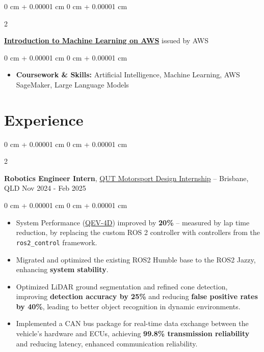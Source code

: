 \documentclass[10pt, letterpaper]{article}
\newenvironment{highlights}{
    \begin{itemize}[
        topsep=0.10 cm,
        parsep=0.10 cm,
        partopsep=0pt,
        itemsep=0pt,
        leftmargin=0 cm + 10pt
    ]
}{
    \end{itemize}
} %
\newenvironment{onecolentry}{
    \begin{adjustwidth}{
        0 cm + 0.00001 cm
    }{
        0 cm + 0.00001 cm
    }
}{
    \end{adjustwidth}
} %
\newenvironment{twocolentry}[2][]{
    \onecolentry
    \def\secondColumn{#2}
    \setcolumnwidth{\fill, 4.5 cm}
    \begin{paracol}{2}
}{
    \switchcolumn \raggedleft \secondColumn
    \end{paracol}
    \endonecolentry
} %
\begin{document}
\vspace{0.2 cm}

\begin{twocolentry}{
            issued by AWS
      }
      \textbf{\href{https://www.coursera.org/account/accomplishments/verify/6ELNTS6QUBYK}{Introduction to Machine Learning on AWS}}\end{twocolentry}

\vspace{0.10 cm}
\begin{onecolentry}
      \begin{highlights}

            \item \textbf{Coursework \& Skills:} Artificial Intelligence, Machine Learning, AWS SageMaker, Large Language Models

      \end{highlights}
\end{onecolentry}

\section{Experience}

\begin{twocolentry}{
            Nov 2024 - Feb 2025
      }
      \textbf{Robotics Engineer Intern}, \href{https://qutmotorsport.com/}{QUT Motorsport Design Internship} -- Brisbane, QLD\end{twocolentry}

\vspace{0.10 cm}
\begin{onecolentry}

      \begin{highlights}
            \item System Performance (\href{https://qutmotorsport.com/qev-3d/}{QEV-4D}) improved 
            by \textbf{20\%} – measured by lap time reduction, by replacing the custom ROS 2 controller with 
            controllers from the \texttt{ros2\_control} framework.
            \item Migrated and optimized the existing ROS2 Humble base to the ROS2 Jazzy, enhancing 
            \textbf{system stability}.
            \item Optimized LiDAR ground segmentation and refined cone detection, 
            improving \textbf{detection accuracy by 25\%} and reducing \textbf{false positive rates by 40\%}, leading to 
            better object recognition in dynamic environments.
            \item Implemented a CAN bus package for real-time data exchange 
            between the vehicle’s hardware and ECUs, achieving \textbf{99.8\% transmission reliability} and 
            reducing latency, enhanced communication reliability.
        \end{highlights}
        
\end{onecolentry}
\end{document}
